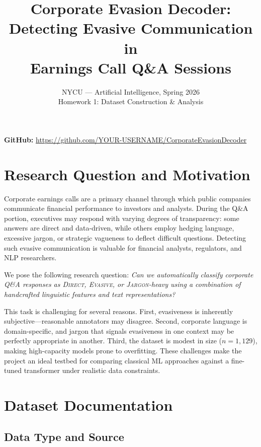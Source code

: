\documentclass[12pt]{article}
\title{%
    \textbf{Corporate Evasion Decoder:}\\[4pt]
    \large Detecting Evasive Communication in\\
    Earnings Call Q\&A Sessions
}
\author{
    NYCU --- Artificial Intelligence, Spring 2026\\[2pt]
    Homework 1: Dataset Construction \& Analysis
}
\date{}
\begin{document}
\maketitle
\thispagestyle{empty}

\noindent\textbf{GitHub:}
\url{https://github.com/YOUR-USERNAME/CorporateEvasionDecoder}

\section{Research Question and Motivation}

Corporate earnings calls are a primary channel through which public companies
communicate financial performance to investors and analysts. During the Q\&A
portion, executives may respond with varying degrees of transparency: some
answers are direct and data-driven, while others employ hedging language,
excessive jargon, or strategic vagueness to deflect difficult questions.
Detecting such evasive communication is valuable for financial analysts,
regulators, and NLP researchers.

We pose the following research question: \emph{Can we automatically classify
corporate Q\&A responses as \textsc{Direct}, \textsc{Evasive}, or
\textsc{Jargon}-heavy using a combination of handcrafted linguistic features
and text representations?}

This task is challenging for several reasons. First, evasiveness is inherently
subjective---reasonable annotators may disagree. Second, corporate language is
domain-specific, and jargon that signals evasiveness in one context may be
perfectly appropriate in another. Third, the dataset is modest in size
(\(n = 1{,}129\)), making high-capacity models prone to overfitting. These
challenges make the project an ideal testbed for comparing classical ML
approaches against a fine-tuned transformer under realistic data constraints.

\section{Dataset Documentation}

\subsection{Data Type and Source}
\end{document}
